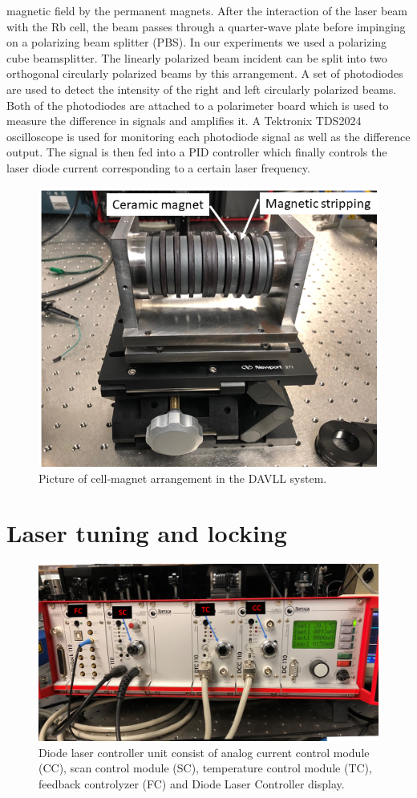 magnetic field by the permanent magnets. After the interaction of the
laser beam with the Rb cell, the beam passes through a quarter-wave
plate before impinging on a polarizing beam splitter (PBS).  In our
experiments we used a polarizing cube beamsplitter. The linearly
polarized beam incident can be split into two orthogonal circularly
polarized beams by this arrangement. A set of photodiodes are used to
detect the intensity of the right and left circularly polarized
beams. Both of the photodiodes are attached to a polarimeter board
which is used to measure the difference in signals and amplifies it. A
Tektronix TDS2024 oscilloscope is used for monitoring each photodiode
signal as well as the difference output. The signal is then fed into a
PID controller which finally controls the laser diode current
corresponding to a certain laser frequency.

\begin{figure}%
\centering
\includegraphics[width=0.7\linewidth]{figures/magnet.png}
\caption{Picture of cell-magnet arrangement in the DAVLL system.\label{fig:magnet}}
\end{figure}

\section{Laser tuning and locking}


\begin{figure}%
\centering
\includegraphics[width=\linewidth]{figures/laser_control_}
\caption{Diode laser controller unit consist of analog current control
  module (CC), scan control module (SC), temperature control module
  (TC), feedback controlyzer (FC) and Diode Laser Controller
  display.\label{fig:laser controller}}
\end{figure}



